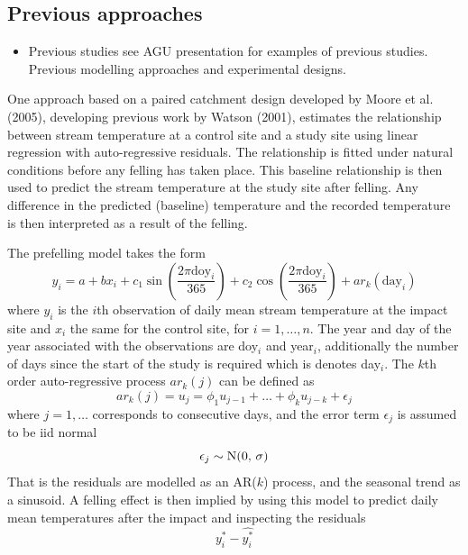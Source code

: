 \subsection{Previous approaches}

\begin{itemize}
\item Previous studies see AGU presentation for examples of previous studies. Previous modelling approaches and experimental designs.
\end{itemize}

One approach based on a paired catchment design developed by Moore et al. (2005), developing previous work by Watson (2001), estimates the relationship between stream temperature at a control site and a study site using linear regression with auto-regressive residuals.  The relationship is fitted under natural conditions before any felling has taken place.  This baseline relationship is then used to predict the stream temperature at the study site after felling.  Any difference in the predicted (baseline) temperature and the recorded temperature is then interpreted as a result of the felling. 

The prefelling model takes the form
\begin{equation}
  y_i = a + b x_i + c_1 \sin\left( \frac{2 \pi \text{doy}_i}{365} \right) + 
                    c_2 \cos\left( \frac{2 \pi \text{doy}_i}{365} \right) + ar_k(\text{day}_i)
\end{equation}
where $y_i$ is the $i$th observation of daily mean stream temperature at the impact site and $x_i$ the same for the control site, for $i = 1, \ldots, n$.  The year and day of the year associated with the observations are doy${}_i$ and year${}_i$, additionally the number of days since the start of the study is required which is denotes day${}_i$. The $k$th order auto-regressive process $ar_k(j)$ can be defined as
\begin{equation}
  ar_k(j) = u_j = \phi_1 u_{j-1} + \ldots + \phi_k u_{j-k} + \epsilon_j
\end{equation}
where $j = 1, \ldots$ corresponds to consecutive days, and the error term $\epsilon_j$ is assumed to be iid normal
\begin{equation}
  \epsilon_j \sim \operatorname{N}(0,\, \sigma)
\end{equation}
That is the residuals are modelled as an AR($k$) process, and the seasonal trend as a sinusoid.  A felling effect is then implied by using this model to predict daily mean temperatures after the impact and inspecting the residuals
\begin{equation}
  y_i^* - \hat{y_i^*}
\end{equation}

